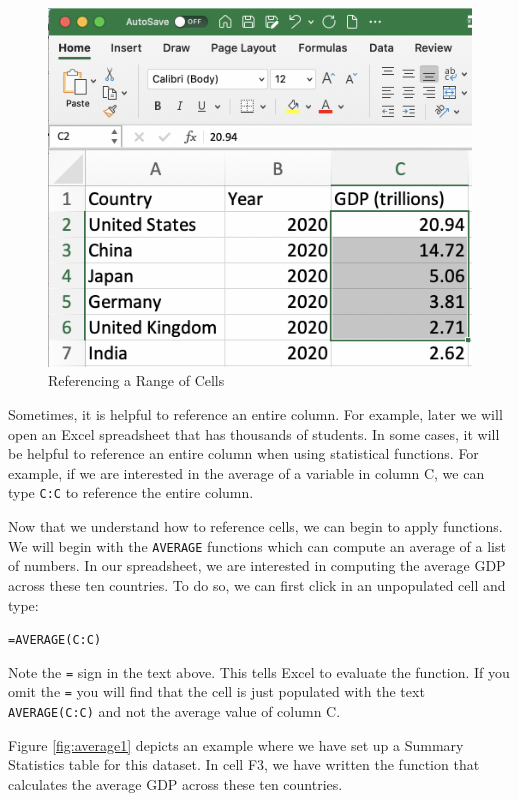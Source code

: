 \documentclass[
]{book}
\begin{document}
\begin{figure}

{\centering \includegraphics[width=0.7\linewidth]{images/01_cells} 

}

\caption{Referencing a Range of Cells}\label{fig:cells}
\end{figure}

Sometimes, it is helpful to reference an entire column. For example, later we will open an Excel spreadsheet that has thousands of students. In some cases, it will be helpful to reference an entire column when using statistical functions. For example, if we are interested in the average of a variable in column C, we can type \texttt{C:C} to reference the entire column.

Now that we understand how to reference cells, we can begin to apply functions. We will begin with the \texttt{AVERAGE} functions which can compute an average of a list of numbers. In our spreadsheet, we are interested in computing the average GDP across these ten countries. To do so, we can first click in an unpopulated cell and type:

\begin{center}
\colorbox{gray!20}{\texttt{=AVERAGE(C:C)}}
\end{center}

Note the \texttt{=} sign in the text above. This tells Excel to evaluate the function. If you omit the \texttt{=} you will find that the cell is just populated with the text \texttt{AVERAGE(C:C)} and not the average value of column C.

Figure \ref{fig:average1} depicts an example where we have set up a Summary Statistics table for this dataset. In cell F3, we have written the function that calculates the average GDP across these ten countries.
\end{document}
